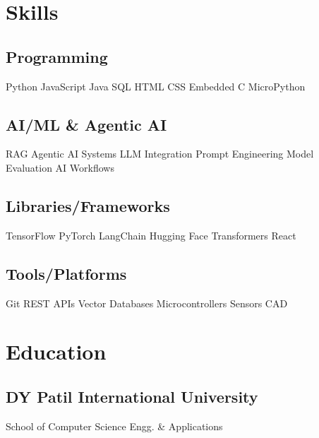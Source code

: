 \documentclass[]{plushcv}
\begin{document}
\hfill
\begin{minipage}[t]{0.25\textwidth} 


\section{Skills}

\subsection{Programming}
\sectionsep
Python \textbullet{} JavaScript \textbullet{} Java \textbullet{} SQL 
\textbullet{} HTML \textbullet{} CSS \textbullet{} Embedded C \textbullet{} MicroPython

\sectionsep

\subsection{AI/ML \& Agentic AI}
\sectionsep
RAG \textbullet{} Agentic AI Systems 
\textbullet{} LLM Integration \textbullet{} Prompt Engineering \textbullet{} Model Evaluation \textbullet{} AI Workflows

\sectionsep

\subsection{Libraries/Frameworks}
\sectionsep
 TensorFlow \textbullet{} PyTorch 
\textbullet{} LangChain \textbullet{} Hugging Face Transformers \textbullet{} React

\sectionsep

\subsection{Tools/Platforms}
\sectionsep
Git \textbullet{} REST APIs \textbullet{} Vector Databases 
 \textbullet{} Microcontrollers \textbullet{} Sensors 
\textbullet{} CAD

\section{Education}

\subsection{DY Patil International University}
School of Computer Science Engg. \& Applications \\


\end{minipage}
\end{document}
